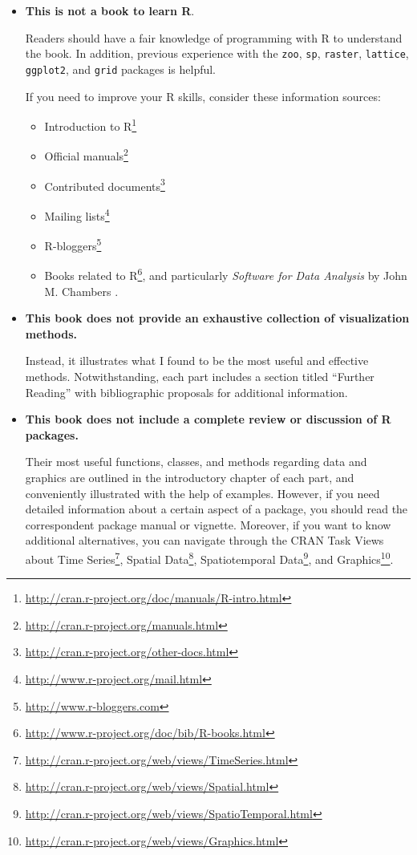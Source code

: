 \begin{itemize}
\item \textbf{This is not a book to learn \textsf{R}}. 

  Readers should have a fair knowledge of programming with \textsf{R}
  to understand the book. In addition, previous experience with the
  \texttt{zoo}, \texttt{sp}, \texttt{raster}, \texttt{lattice},
  \texttt{ggplot2}, and \texttt{grid} packages is helpful.

  If you need to improve your \textsf{R} skills, consider these
  information sources:

  \begin{itemize}
  \item Introduction to \textsf{R}\footnote{\url{http://cran.r-project.org/doc/manuals/R-intro.html}}
  \item Official manuals\footnote{\url{http://cran.r-project.org/manuals.html}}
  \item Contributed documents\footnote{\url{http://cran.r-project.org/other-docs.html}}
  \item Mailing lists\footnote{\url{http://www.r-project.org/mail.html}}
  \item R-bloggers\footnote{\url{http://www.r-bloggers.com}}
  \item Books related to
    \textsf{R}\footnote{\url{http://www.r-project.org/doc/bib/R-books.html}},
    and particularly \emph{Software for Data Analysis} by John
    M. Chambers \cite{Chambers2008}.
  \end{itemize}


\item \textbf{This book does not provide an exhaustive collection of
  visualization methods.}

Instead, it illustrates what I found to be the most useful and
effective methods. Notwithstanding, each part includes a section
titled ``Further Reading'' with bibliographic proposals for additional
information.


\item \textbf{This book does not include a complete review or
    discussion of \textsf{R} packages.}

  Their most useful functions, classes, and methods regarding data and
  graphics are outlined in the introductory chapter of each part, and
  conveniently illustrated with the help of examples. However, if you
  need detailed information about a certain aspect of a package, you
  should read the correspondent package manual or vignette. Moreover,
  if you want to know additional alternatives, you can navigate through
  the CRAN Task Views about Time
  Series\footnote{\url{http://cran.r-project.org/web/views/TimeSeries.html}},
  Spatial
  Data\footnote{\url{http://cran.r-project.org/web/views/Spatial.html}},
  Spatiotemporal
  Data\footnote{\url{http://cran.r-project.org/web/views/SpatioTemporal.html}},
  and
  Graphics\footnote{\url{http://cran.r-project.org/web/views/Graphics.html}}.



\end{itemize}
